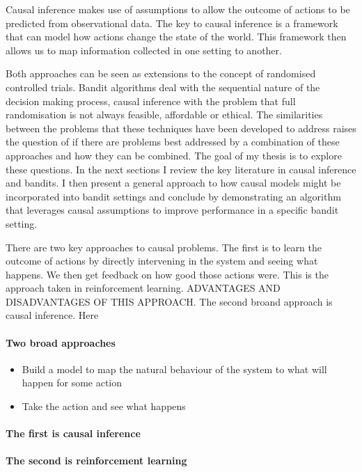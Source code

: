\documentclass[11pt,a4paper,oneside]{book}
\begin{document}
Causal inference makes use of assumptions to allow the outcome of actions to be predicted from
observational data. The key to causal inference is a framework that can model how actions
change the state of the world. This framework then allows us to map information collected in
one setting to another.

Both approaches can be seen as extensions to the concept of randomised controlled trials. Bandit
algorithms deal with the sequential nature of the decision making process, causal inference with
the problem that full randomisation is not always feasible, affordable or ethical. The similarities
between the problems that these techniques have been developed to address raises the question
of if there are problems best addressed by a combination of these approaches and how they
can be combined. The goal of my thesis is to explore these questions. In the next sections I
review the key literature in causal inference and bandits. I then present a general approach to
how causal models might be incorporated into bandit settings and conclude by demonstrating
an algorithm that leverages causal assumptions to improve performance in a specific bandit
setting.

There are two key approaches to causal problems. The first is to learn the outcome of actions by directly intervening in the system and seeing what happens. We then get feedback on how good those actions were. This is the approach taken in reinforcement learning. ADVANTAGES AND DISADVANTAGES OF THIS APPROACH. The second broand approach is causal inference. Here



\paragraph*{Two broad approaches} 
\begin{itemize}
\item Build a model to map the natural behaviour of the system to what will happen for some action
\item Take the action and see what happens
\end{itemize}

\paragraph*{The first is causal inference}

\paragraph*{The second is reinforcement learning}
\end{document}
